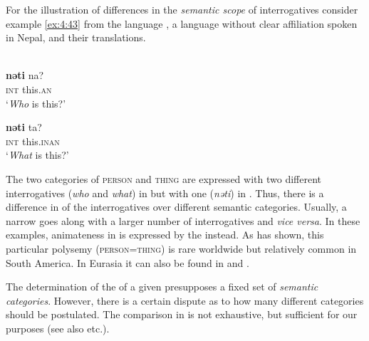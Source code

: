 For the illustration of differences in the \textit{semantic scope} of interrogatives consider example \ref{ex:4:43} from the language , a language without clear affiliation spoken in Nepal, and their  translations.

\ea%
    \label{ex:4:43}
    \\
    \ea
    \gll \textbf{{nəti}} na?\\
    \textsc{int}  this.\textsc{an}\\
    \glt ‘\textit{Who} is this?’

    \ex
    \gll \textbf{{nəti}} ta?\\
    \textsc{int}  this.\textsc{inan}\\
    \glt ‘\textit{What} is this?’ \citep[48]{Watters2006}
    \z
    \z

\noindent The two categories of \textsc{person} and \textsc{thing} are expressed with two different interrogatives (\textit{who} and \textit{what}) in  but with one (\textit{nəti}) in . Thus, there is a difference in  of the interrogatives over different semantic categories. Usually, a narrow  goes along with a larger number of interrogatives and \textit{vice versa}. In these examples, animateness in  is expressed by the  instead. As \cite{Cysouw2005,Cysouw2007} has shown, this particular polysemy (\textsc{person}=\textsc{thing}) is rare worldwide but relatively common in South America. In Eurasia it can also be found in  and .

The determination of the  of a given  presupposes a fixed set of \textit{semantic categories}. However, there is a certain dispute as to how many different categories should be postulated. The comparison in  is not exhaustive, but sufficient for our purposes (see also \citealt{Mushin1995} etc.).

